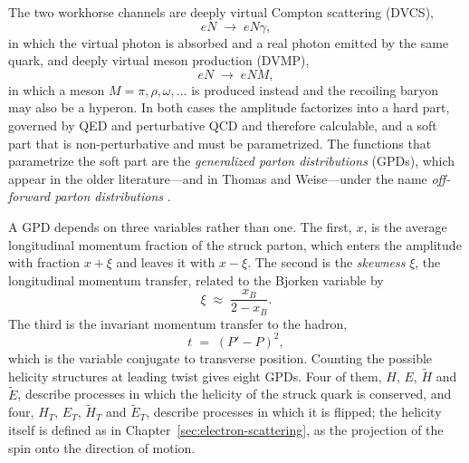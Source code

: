 The two workhorse channels are deeply virtual Compton scattering (DVCS),
\begin{equation}
    eN \;\rightarrow\; eN\gamma,
    \label{eq:dvcs-reaction}
\end{equation}
in which the virtual photon is absorbed and a real photon emitted by the same quark, and
deeply virtual meson production (DVMP),
\begin{equation}
    eN \;\rightarrow\; eN M,
    \label{eq:dvmp-reaction}
\end{equation}
in which a meson $M=\pi,\rho,\omega,\dots$ is produced instead and the recoiling baryon
may also be a hyperon. In both cases the amplitude factorizes into a hard part, governed
by QED and perturbative QCD and therefore calculable, and a soft part that is
non-perturbative and must be parametrized. The functions that parametrize the soft part
are the \emph{generalized parton distributions} (GPDs), which appear in the older
literature---and in Thomas and Weise---under the name \emph{off-forward parton
distributions} \cite[Ch.~4.8]{ThomasWeise2001}.

A GPD depends on three variables rather than one. The first, $x$, is the average
longitudinal momentum fraction of the struck parton, which enters the amplitude with
fraction $x+\xi$ and leaves it with $x-\xi$. The second is the \emph{skewness} $\xi$, the
longitudinal momentum transfer, related to the Bjorken variable by
\begin{equation}
    \xi \;\approx\; \frac{x_{B}}{2 - x_{B}}.
    \label{eq:skewness}
\end{equation}
The third is the invariant momentum transfer to the hadron,
\begin{equation}
    t \;=\; (P' - P)^{2},
    \label{eq:mandelstam-t}
\end{equation}
which is the variable conjugate to transverse position. Counting the possible
helicity structures at leading twist gives eight GPDs. Four of them, $H$, $E$,
$\widetilde H$ and $\widetilde E$, describe processes in which the helicity of the struck
quark is conserved, and four, $H_{T}$, $E_{T}$, $\widetilde H_{T}$ and $\widetilde
E_{T}$, describe processes in which it is flipped; the helicity itself is defined as in
Chapter~\ref{sec:electron-scattering}, as the projection of the spin onto the direction
of motion.


